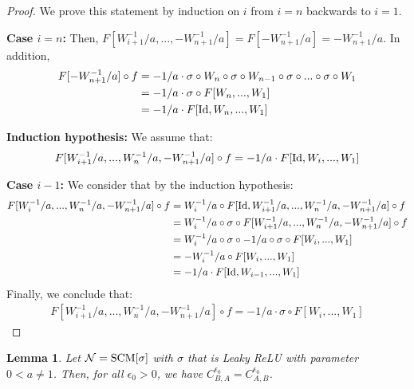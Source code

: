 \documentclass{article} %
\newtheorem{lem}{Lemma}
\newcommand{\Id}{\textnormal{Id}}
\begin{document}
\begin{proof} We prove this statement by induction on $i$ from $i=n$ backwards to $i=1$. 

\textbf{Case $i=n$:} Then, $F[W^{-1}_{i+1}/a,...,-W^{-1}_{n+1}/a] = F[-W^{-1}_{n+1}/a] = -W^{-1}_{n+1}/a$. In addition,
\begin{equation}
\begin{aligned}
F[-W^{-1}_{n+1}/a] \circ f &= -1/a \cdot \sigma \circ W_n \circ \sigma \circ W_{n-1} \circ \sigma \circ ... \circ \sigma \circ W_1 \\
&= -1/a \cdot \sigma \circ F[W_n,...,W_1]\\
&= -1/a \cdot F[\Id,W_{n},...,W_1]
\end{aligned}
\end{equation}

\textbf{Induction hypothesis:} We assume that:
\begin{equation}
\begin{aligned}
F[W^{-1}_{i+1}/a,...,W^{-1}_n/a,-W^{-1}_{n+1}/a] \circ f = -1/a \cdot F[\Id,W_{i},...,W_1]
\end{aligned}
\end{equation}

\textbf{Case $i-1$:} We consider that by the induction hypothesis:
\begin{equation}
\begin{aligned}
F[W^{-1}_{i}/a,...,W^{-1}_n/a,-W^{-1}_{n+1}/a] \circ f 
&= W^{-1}_{i}/a \circ F[\Id,W^{-1}_{i+1}/a,...,W^{-1}_n/a,-W^{-1}_{n+1}/a] \circ f \\
&= W^{-1}_{i}/a \circ \sigma \circ F[W^{-1}_{i+1}/a,...,W^{-1}_n/a,-W^{-1}_{n+1}/a] \circ f \\
&= W^{-1}_{i}/a \circ \sigma \circ -1/a \circ \sigma \circ  F[W_{i},...,W_1] \\
&= -W^{-1}_{i}/a \circ F[W_{i},...,W_1] \\
&= -1/a \cdot F[\Id,W_{i-1},...,W_1] \\
\end{aligned}
\end{equation}
Finally, we conclude that:
\begin{equation}
\begin{aligned}
F[W^{-1}_{i+1}/a,...,W^{-1}_n/a,-W^{-1}_{n+1}/a] \circ f = -1/a \cdot \sigma \circ F[W_{i},...,W_1]
\end{aligned}
\end{equation}
\end{proof}

\begin{lem}\label{lem:inverseAB} Let $\mathcal{N} = \textnormal{SCM}[\sigma]$ with $\sigma$ that is Leaky ReLU with parameter $0<a\neq 1$. Then, for all $\epsilon_0>0$, we have $C^{\epsilon_0}_{B,A} = C^{\epsilon_0}_{A,B}$.
\end{lem}
\end{document}
